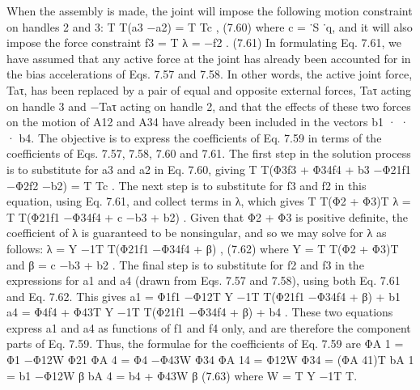 When the assembly is made, the joint will impose the following motion constraint on handles 2 and 3: T T(a3 −a2) = T Tc , (7.60) where c = ˙S ˙q, and it will also impose the force constraint f3 = T λ = −f2 . (7.61) In formulating Eq. 7.61, we have assumed that any active force at the joint has already been accounted for in the bias accelerations of Eqs. 7.57 and 7.58. In other words, the active joint force, Taτ, has been replaced by a pair of equal and opposite external forces, Taτ acting on handle 3 and −Taτ acting on handle 2, and that the effects of these two forces on the motion of A12 and A34 have already been included in the vectors b1 · · · b4. The objective is to express the coefficients of Eq. 7.59 in terms of the coefficients of Eqs. 7.57, 7.58, 7.60 and 7.61. The first step in the solution process is to substitute for a3 and a2 in Eq. 7.60, giving T T(Φ3f3 + Φ34f4 + b3 −Φ21f1 −Φ2f2 −b2) = T Tc . The next step is to substitute for f3 and f2 in this equation, using Eq. 7.61, and collect terms in λ, which gives T T(Φ2 + Φ3)T λ = T T(Φ21f1 −Φ34f4 + c −b3 + b2) . Given that Φ2 + Φ3 is positive definite, the coefficient of λ is guaranteed to be nonsingular, and so we may solve for λ as follows: λ = Y −1T T(Φ21f1 −Φ34f4 + β) , (7.62) where Y = T T(Φ2 + Φ3)T and β = c −b3 + b2 . The final step is to substitute for f2 and f3 in the expressions for a1 and a4 (drawn from Eqs. 7.57 and 7.58), using both Eq. 7.61 and Eq. 7.62. This gives a1 = Φ1f1 −Φ12T Y −1T T(Φ21f1 −Φ34f4 + β) + b1 a4 = Φ4f4 + Φ43T Y −1T T(Φ21f1 −Φ34f4 + β) + b4 . These two equations express a1 and a4 as functions of f1 and f4 only, and are therefore the component parts of Eq. 7.59. Thus, the formulae for the coefficients of Eq. 7.59 are ΦA 1 = Φ1 −Φ12W Φ21 ΦA 4 = Φ4 −Φ43W Φ34 ΦA 14 = Φ12W Φ34 = (ΦA 41)T bA 1 = b1 −Φ12W β bA 4 = b4 + Φ43W β (7.63) where W = T Y −1T T.

